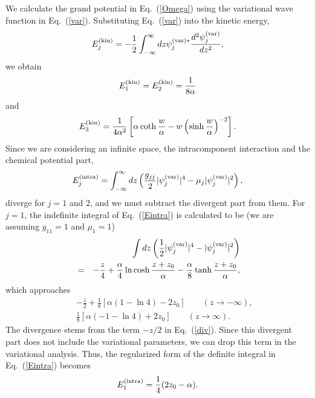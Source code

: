 \documentclass[pra,aps,superscriptaddress,twocolumn,color]{revtex4-1}
\begin{document}
We calculate the grand potential in Eq.~(\ref{Omega}) using the variational
wave function in Eq.~(\ref{var}).
Substituting Eq.~(\ref{var}) into the kinetic energy,
\begin{equation}
  E_j^{\rm (kin)} = -\frac{1}{2} \int_{-\infty}^\infty dz \psi_j^{\rm (var)*}
  \frac{d^2\psi_j^{\rm (var)}}{dz^2},
\end{equation}
we obtain
\begin{equation} \label{a1}
  E_1^{\rm (kin)} = E_2^{\rm (kin)} = \frac{1}{8 \alpha}
\end{equation}
and
\begin{equation} \label{a2}
  E_3^{\rm (kin)} = \frac{1}{4\alpha^2} \left[ \alpha \coth \frac{w}{\alpha}
  - w \left( \sinh \frac{w}{\alpha} \right)^{-2} \right].
\end{equation}
Since we are considering an infinite space, the intracomponent interaction
and the chemical potential part,
\begin{equation} \label{Eintra}
  E_j^{\rm (intra)} = \int_{-\infty}^\infty dz \left(
  \frac{g_{jj}}{2} |\psi_j^{\rm (var)}|^4
  - \mu_j |\psi_j^{\rm (var)}|^2 \right),
\end{equation}
diverge for $j = 1$ and 2, and we must subtract the divergent part from
them.
For $j = 1$, the indefinite integral of Eq.~(\ref{Eintra}) is calculated to
be (we are assuming $g_{11} = 1$ and $\mu_1 = 1$)
\begin{eqnarray}
& & \int dz \left( \frac{1}{2} |\psi_j^{\rm (var)}|^4
- |\psi_j^{\rm (var)}|^2 \right) \nonumber \\
& = & -\frac{z}{4} + \frac{\alpha}{4} \ln \cosh \frac{z + z_0}{\alpha}
- \frac{\alpha}{8} \tanh \frac{z + z_0}{\alpha},
\end{eqnarray}
which approaches
\begin{subequations}
\begin{eqnarray}
  \label{div}
  & & -\frac{z}{2} + \frac{1}{8}[\alpha (1 - \ln 4) - 2 z_0]
  \qquad (z \rightarrow -\infty), \\
  & & \frac{1}{8} [\alpha (-1 - \ln 4) + 2 z_0]
  \qquad (z \rightarrow \infty).
\end{eqnarray}
\end{subequations}
The divergence stems from the term $-z / 2$ in Eq.~(\ref{div}).
Since this divergent part does not include the variational parameters, we can
drop this term in the variational analysis.
Thus, the regularized form of the definite integral in Eq.~(\ref{Eintra})
becomes
\begin{equation} \label{a3}
E_1^{\rm (intra)} = \frac{1}{4}(2 z_0 - \alpha).
\end{equation}
\end{document}
